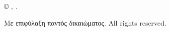 \thispagestyle{empty}

\copyright{} \thesisauthorlatin, \thesisyear.

Με επιφύλαξη παντός δικαιώματος. \textenglish{All rights reserved.}

\clearpage
